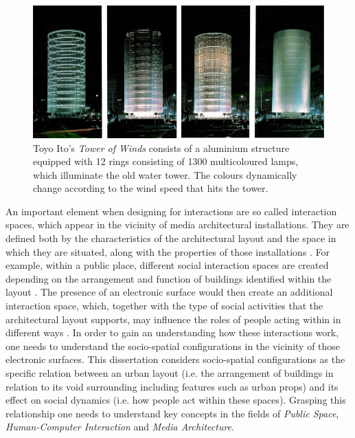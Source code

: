 \begin{figure}[!t] 
\centering
\includegraphics[width=\textwidth]{Illustrations/Ito_T_WindTower_c_El_Croquis_1986.jpg}
\caption[\textit{Tower of Winds} by Toyo Ito, 1986, Image taken from El Croquis]{Toyo Ito's \textit{Tower of Winds} consists of a aluminium structure equipped with 12 rings consisting of 1300 multicoloured lamps, which  illuminate the old water tower. The colours dynamically change according to the wind speed that hits the tower.}
\label{Towerofwinds}
\end{figure}


An important element when designing for interactions are so called interaction spaces, which appear in the vicinity of media architectural installations. They are defined both by the characteristics of the architectural layout and the space in which they are situated, along with the properties of those installations \cite{Oneill_2006}. 
For example, within a public place, different social interaction spaces are created depending on the arrangement and function of buildings identified within the layout \cite{Behrens_2014} \cite{Goffman_1966}. 
The presence of an electronic surface would then create an additional interaction space, which, together with the type of social activities that the architectural layout supports, may influence the roles of people acting within in different ways \cite{Fatah_2010}.
In order to gain an understanding how these interactions work, one needs to understand the socio-spatial configurations in the vicinity of those electronic surfaces.
This dissertation considers socio-spatial configurations as the specific relation between an urban layout (i.e. the arrangement of buildings in relation to its void surrounding including features such as urban props) and its effect on social dynamics (i.e. how people act within these spaces). 
Grasping this relationship one needs to understand key concepts in the fields of \textit{Public Space}, \textit{Human-Computer Interaction} and \textit{Media Architecture}.   

